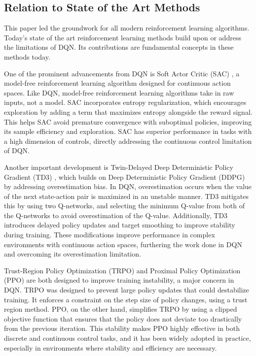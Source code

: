 \documentclass{article}
\begin{document}
\subsection{Relation to State of the Art Methods}
This paper led the groundwork for all modern reinforcement learning algorithms. Today's state of the art reinforcement learning methods build upon or address the limitations of DQN. Its contributions are fundamental concepts in these methods today. 

One of the prominent advancements from DQN is Soft Actor Critic (SAC) \cite{muzero}, a model-free reinforcement learning algorithm designed for continuous action spaces. Like DQN, model-free reinforcement learning algorithms take in raw inputs, not a model. SAC incorporates entropy regularization, which encourages exploration by adding a term that maximizes entropy alongside the reward signal. This helps SAC avoid premature convergence with suboptimal policies, improving its sample efficiency and exploration. SAC has superior performance in tasks with a high dimension of controls, directly addressing the continuous control limitation of DQN. 

Another important development is Twin-Delayed Deep Deterministic Policy Gradient (TD3) \cite{TD3}, which builds on Deep Deterministic Policy Gradient (DDPG) \cite{DDPG} by addressing overestimation bias. In DQN, overestimation occurs when the value of the next state-action pair is maximized in an unstable manner. TD3 mitigates this by using two Q-networks, and selecting the minimum Q-value from both of the Q-networks to avoid overestimation of the Q-value. Additionally, TD3 introduces delayed policy updates and target smoothing to improve stability during training. These modifications improve performance in complex environments with continuous action spaces, furthering the work done in DQN and overcoming its overestimation limitation. 

Trust-Region Policy Optimization (TRPO) \cite{TRPO} and Proximal Policy Optimization (PPO) \cite{PPO} are both designed to improve training instability, a major concern in DQN. TRPO was designed to prevent large policy updates that could destabilize training. It enforces a constraint on the step size of policy changes, using a trust region method. PPO, on the other hand, simplifies TRPO by using a clipped objective function that ensures that the policy does not deviate too drastically from the previous iteration. This stability makes PPO highly effective in both discrete and continuous control tasks, and it has been widely adopted in practice, especially in environments where stability and efficiency are necessary.
\end{document}
